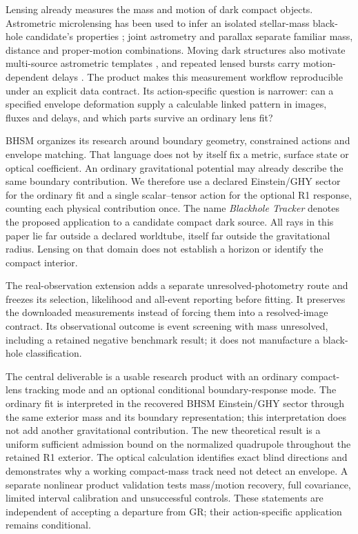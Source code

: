 \documentclass[11pt,a4paper]{article}
\begin{document}
Lensing already measures the mass and motion of dark compact objects.
Astrometric microlensing has been used to infer an isolated stellar-mass
black-hole candidate's properties \cite{Sahu2022}; joint astrometry and
parallax separate familiar mass, distance and proper-motion combinations.
Moving dark structures also motivate multi-source astrometric templates
\cite{VanTilburg2018}, and repeated lensed bursts carry motion-dependent
delays \cite{Dai2017}. The product makes this measurement workflow reproducible under an explicit
data contract. Its action-specific question is narrower: can a specified
envelope deformation supply a calculable linked pattern in images, fluxes
and delays, and which parts survive an ordinary lens fit?

BHSM organizes its research around boundary geometry, constrained actions
and envelope matching. That language does not by itself fix a metric,
surface state or optical coefficient. An ordinary gravitational potential
may already describe the same boundary contribution. We therefore use a
declared Einstein/GHY sector for the ordinary fit and a single
scalar--tensor action for the optional R1 response, counting each
physical contribution once. The name
\emph{Blackhole Tracker} denotes the proposed application to a candidate
compact dark source. All rays in this paper lie far outside a declared
worldtube, itself far outside the gravitational radius. Lensing on that
domain does not establish a horizon or identify the compact interior.

The real-observation extension adds a separate unresolved-photometry
route and freezes its selection, likelihood and all-event reporting
before fitting. It preserves the downloaded measurements instead of
forcing them into a resolved-image contract. Its observational outcome is
event screening with mass unresolved, including a retained negative
benchmark result; it does not manufacture a black-hole classification.

The central deliverable is a usable research product with an ordinary
compact-lens tracking mode and an optional conditional boundary-response
mode. The ordinary fit is interpreted in the recovered BHSM Einstein/GHY
sector through the same exterior mass and its boundary representation;
this interpretation does not add another gravitational contribution.
The new theoretical result is a uniform sufficient admission bound
on the normalized quadrupole throughout the retained R1 exterior. The
optical calculation identifies exact blind directions and demonstrates
why a working compact-mass track need not detect an envelope. A separate
nonlinear product validation tests mass/motion recovery, full covariance,
limited interval calibration and unsuccessful controls. These statements
are independent of accepting a departure from GR; their action-specific
application remains conditional.
\end{document}
